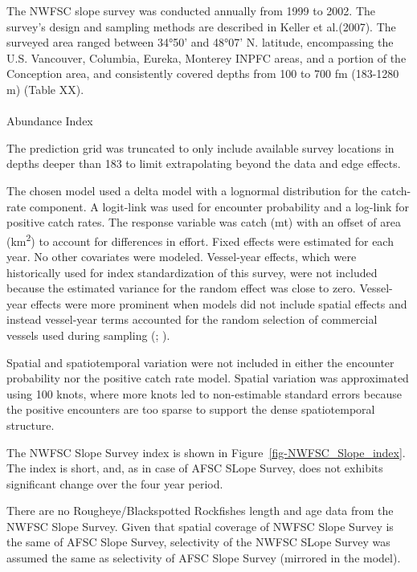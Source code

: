 \documentclass[
]{scrartcl}
\makeatletter
\let\oldparagraph\paragraph
\renewcommand{\paragraph}{
    \@ifstar
      \xxxParagraphStar
      \xxxParagraphNoStar
  }
\newcommand{\xxxParagraphStar}[1]{\oldparagraph*{#1}\mbox{}}
\newcommand{\xxxParagraphNoStar}[1]{\oldparagraph{#1}\mbox{}}
\makeatother
\begin{document}
The NWFSC slope survey was conducted annually from 1999 to 2002. The
survey's design and sampling methods are described in Keller et
al.(2007). The surveyed area ranged between 34°50' and 48°07' N.
latitude, encompassing the U.S. Vancouver, Columbia, Eureka, Monterey
INPFC areas, and a portion of the Conception area, and consistently
covered depths from 100 to 700 fm (183-1280 m) (Table XX).

\paragraph{Abundance Index}\label{abundance-index-3}

The prediction grid was truncated to only include available survey
locations in depths deeper than 183 to limit extrapolating beyond the
data and edge effects.

The chosen model used a delta model with a lognormal distribution for
the catch-rate component. A logit-link was used for encounter
probability and a log-link for positive catch rates. The response
variable was catch (mt) with an offset of area (km\textsuperscript{2})
to account for differences in effort. Fixed effects were estimated for
each year. No other covariates were modeled. Vessel-year effects, which
were historically used for index standardization of this survey, were
not included because the estimated variance for the random effect was
close to zero. Vessel-year effects were more prominent when models did
not include spatial effects and instead vessel-year terms accounted for
the random selection of commercial vessels used during sampling
(;
).

Spatial and spatiotemporal variation were not included in either the
encounter probability nor the positive catch rate model. Spatial
variation was approximated using 100 knots, where more knots led to
non-estimable standard errors because the positive encounters are too
sparse to support the dense spatiotemporal structure.

The NWFSC Slope Survey index is shown in
Figure~\ref{fig-NWFSC_Slope_index}. The index is short, and, as in case
of AFSC SLope Survey, does not exhibits significant change over the four
year period.

There are no Rougheye/Blackspotted Rockfishes length and age data from
the NWFSC Slope Survey. Given that spatial coverage of NWFSC Slope
Survey is the same of AFSC Slope Survey, selectivity of the NWFSC SLope
Survey was assumed the same as selectivity of AFSC Slope Survey
(mirrored in the model).
\end{document}
